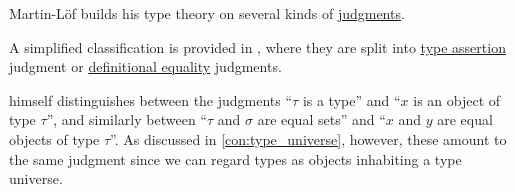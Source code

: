 \begin{remark}\label{rem:typing_judgments}
  Martin-L\"of builds his type theory on several kinds of \hyperref[con:judgment]{judgments}.

  A simplified classification is provided in \cite[19]{UnivalentFoundationsProgram2013HoTT}, where they are split into \hyperref[def:type_assertion]{type assertion} judgment or \hyperref[con:equality]{definitional equality} judgments.

  \Textcite[14]{MartinLöf1984IntuitionisticTypeTheory} himself distinguishes between the judgments \enquote{\( \tau \) is a type} and \enquote{\( x \) is an object of type \( \tau \)}, and similarly between \enquote{\( \tau \) and \( \sigma \) are equal sets} and \enquote{\( x \) and \( y \) are equal objects of type \( \tau \)}. As discussed in \cref{con:type_universe}, however, these amount to the same judgment since we can regard types as objects inhabiting a type universe.
\end{remark}

